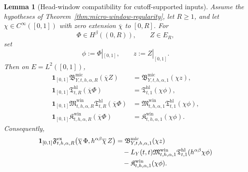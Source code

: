 \documentclass[11pt,a4paper]{amsart}
\theoremstyle{plain}
\newtheorem{lemma}[theorem]{Lemma}
\theoremstyle{definition}
\theoremstyle{remark}
\newcommand{\one}{\mathbf 1}
\begin{document}
\begin{lemma}[Head-window compatibility for cutoff-supported inputs]
\label{lem:window-head-compat}
Assume the hypotheses of Theorem~\ref{thm:micro-window-regularity}, let \(R\ge1\), and let
\(\chi\in C^\infty([0,1])\) with zero extension \(\overline\chi\) to \([0,R]\). For
\[
\Phi\in H^\beta((0,R)),
\qquad
Z\in E_R,
\]
set
\[
\phi:=\Phi|_{[0,1]},
\qquad
z:=Z|_{[0,1]}.
\]
Then on \(E=L^2([0,1])\),
\begin{align}
\one_{[0,1]}\mathfrak B_{Y,t,h,\alpha,R}^{\mathrm{mic}}(\overline\chi Z)
&=
\mathfrak B_{Y,t,h,\alpha,1}^{\mathrm{mic}}(\chi z),
\label{eq:window-head-compat-BY}\\
\one_{[0,1]}\mathfrak T_{t,R}^{\mathrm{hl}}(\overline\chi\Phi)
&=
\mathfrak T_{t,1}^{\mathrm{hl}}(\chi\phi),
\label{eq:window-head-compat-T}\\
\one_{[0,1]}\mathfrak M_{t,h,\alpha,R}^{\mathrm{win}}
\mathfrak T_{t,R}^{\mathrm{hl}}(\overline\chi\Phi)
&=
\mathfrak M_{t,h,\alpha,1}^{\mathrm{win}}
\mathfrak T_{t,1}^{\mathrm{hl}}(\chi\phi),
\label{eq:window-head-compat-M}\\
\one_{[0,1]}\mathfrak K_{t,h,\alpha,R}^{\mathrm{win}}(\overline\chi\Phi)
&=
\mathfrak K_{t,h,\alpha,1}^{\mathrm{win}}(\chi\phi).
\label{eq:window-head-compat-K}
\end{align}
Consequently,
\begin{align}
\one_{[0,1]}
\mathfrak F_{t,h,\alpha,R}^{\mathrm{ex}}
\bigl(
\overline\chi\,\Phi,
h^{\alpha\beta}\overline\chi\,Z
\bigr)
&=
\mathfrak B_{Y,t,h,\alpha,1}^{\mathrm{mic}}(\chi z)
\notag\\
&\quad-
L_Y(t,t)\mathfrak M_{t,h,\alpha,1}^{\mathrm{win}}
\mathfrak T_{t,1}^{\mathrm{hl}}(h^{\alpha\beta}\chi\phi)
\notag\\
&\quad-
\mathfrak K_{t,h,\alpha,1}^{\mathrm{win}}(\chi\phi).
\label{eq:window-head-compat-defect}
\end{align}
\end{lemma}
\end{document}
